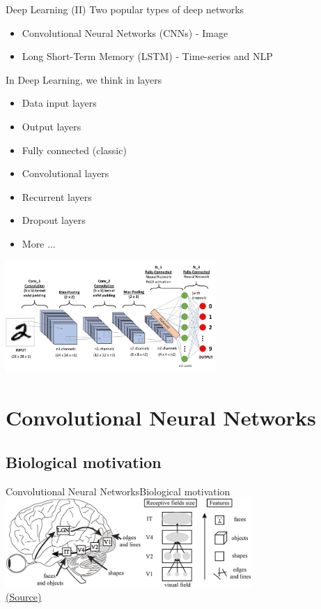 \documentclass[10pt,compress]{beamer} %
\begin{document}
\begin{frame}{Deep Learning (II)}
	Two popular types of deep networks
	\begin{itemize}
		\item Convolutional Neural Networks (CNNs) - Image
		\item Long Short-Term Memory (LSTM) - Time-series and NLP 
	\end{itemize}

	In Deep Learning, we think in layers
	\begin{itemize}
		\item Data input layers
		\item Output layers
        \item Fully connected (classic)
        \item Convolutional layers
        \item Recurrent layers
        \item Dropout layers
        \item More ...
	\end{itemize}


    \vspace{-4cm}
	\hfill \includegraphics[width=0.6\textwidth]{figs/layers.png}\\
\end{frame}

\section{Convolutional Neural Networks}
\subsection{Biological motivation}
\begin{frame}{Convolutional Neural Networks}{Biological motivation}
	\centering
	\includegraphics[width=0.7\textwidth]{figs/cortex.png}\\
	\scriptsize\href{https://www.researchgate.net/publication/267872860_Why_vision_is_not_both_hierarchical_and_feedforward/figures?lo=1}{(Source)}\\
\end{frame}
\end{document}

